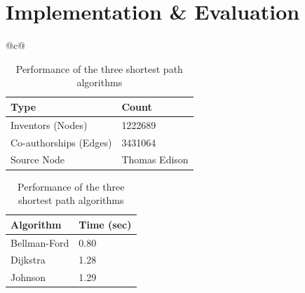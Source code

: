 \section{Implementation \& Evaluation}
\label{sec:eval}


\begin{table}[t] 
	\scriptsize
  \begin{tabular}{@{}c@{}} 
  \begin{minipage}{0.4\linewidth}
		\begin{center}
	  		\begin{tabular}{| l | l |}
				\hline
				
				{Type} & {Count} \\
				\hline
				\hline
				Inventors (Nodes) & 1222689 \\
				Co-authorships (Edges) & 3431064 \\
				Source Node & Thomas Edison\\
				\hline
			\end{tabular}		
			\caption {\scriptsize Details of the co-authorship graph}
			\label{tab:model}

			\vspace{0.85cm}

			\begin{tabular}{| l | l |}
				\hline
				{Algorithm} & {Time (sec)} \\
				\hline
				\hline
				Bellman-Ford & 0.80 \\
				Dijkstra & 1.28 \\
				Johnson & 1.29 \\
				\hline
			\end{tabular}
			\caption {\scriptsize Performance of the three shortest path algorithms}
			\label{tab:algos}
		\end{center}


\end{minipage}
\end{tabular}
\end{table}
